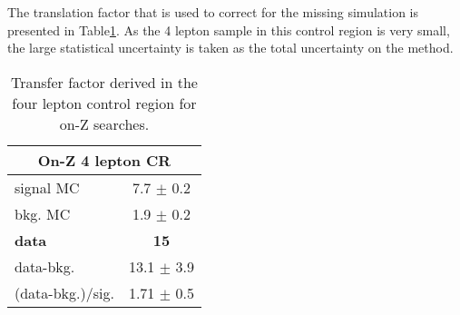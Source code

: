 The translation factor that is used to correct for the missing simulation is presented in Table\ref{tab:ZZonZ}.
As the 4 lepton sample in this control region is very small, the large statistical uncertainty is taken as the total uncertainty on the method.
\begin{table}[ht!]
\def\arraystretch{1.2}
\setlength{\belowcaptionskip}{6pt}
\small
\centering
\caption{Transfer factor derived in the four lepton control region for on-Z searches.}
\label{tab:ZZonZ}
\begin{tabular}{l c }
\hline \hline
\multicolumn{2}{c}{On-Z 4 lepton CR}  \\\hline
signal MC        & 7.7     $\pm$  0.2   \\
bkg. MC          & 1.9  $\pm$  0.2\\ \hline
\textbf{data}       & \textbf{15}  \\
data-bkg.        &  13.1   $\pm$  3.9 \\ \hline
(data-bkg.)/sig. & 1.71   $\pm$  0.5\\\hline\hline
\end{tabular}
\end{table}

